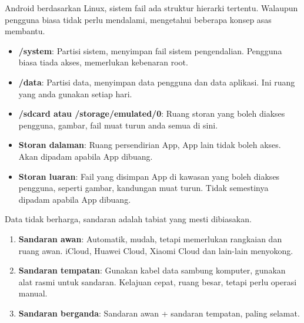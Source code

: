 Android berdasarkan Linux, sistem fail ada struktur hierarki tertentu. Walaupun pengguna biasa tidak perlu mendalami, mengetahui beberapa konsep asas membantu.


\begin{itemize}
  \item \textbf{/system}: Partisi sistem, menyimpan fail sistem pengendalian. Pengguna biasa tiada akses, memerlukan kebenaran root.
  \item \textbf{/data}: Partisi data, menyimpan data pengguna dan data aplikasi. Ini ruang yang anda gunakan setiap hari.
  \item \textbf{/sdcard atau /storage/emulated/0}: Ruang storan yang boleh diakses pengguna, gambar, fail muat turun anda semua di sini.
\end{itemize}


\begin{itemize}
  \item \textbf{Storan dalaman}: Ruang persendirian App, App lain tidak boleh akses. Akan dipadam apabila App dibuang.
  \item \textbf{Storan luaran}: Fail yang disimpan App di kawasan yang boleh diakses pengguna, seperti gambar, kandungan muat turun. Tidak semestinya dipadam apabila App dibuang.
\end{itemize}


Data tidak berharga, sandaran adalah tabiat yang mesti dibiasakan.


\begin{enumerate}
  \item \textbf{Sandaran awan}: Automatik, mudah, tetapi memerlukan rangkaian dan ruang awan. iCloud, Huawei Cloud, Xiaomi Cloud dan lain-lain menyokong.
  \item \textbf{Sandaran tempatan}: Gunakan kabel data sambung komputer, gunakan alat rasmi untuk sandaran. Kelajuan cepat, ruang besar, tetapi perlu operasi manual.
  \item \textbf{Sandaran berganda}: Sandaran awan + sandaran tempatan, paling selamat.
\end{enumerate}


